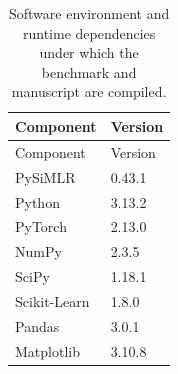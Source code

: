 \documentclass[
  10pt,
  letterpaper,
]{report}
\begin{document}

\begin{longtable}[]{@{}ll@{}}
\caption{Software environment and runtime dependencies under which the
benchmark and manuscript are
compiled.}\label{tbl-software-environment}\tabularnewline
\toprule\noalign{}
Component & Version \\
\midrule\noalign{}
\endfirsthead
\toprule\noalign{}
Component & Version \\
\midrule\noalign{}
\endhead
\bottomrule\noalign{}
\endlastfoot
PySiMLR & 0.43.1 \\
Python & 3.13.2 \\
PyTorch & 2.13.0 \\
NumPy & 2.3.5 \\
SciPy & 1.18.1 \\
Scikit-Learn & 1.8.0 \\
Pandas & 3.0.1 \\
Matplotlib & 3.10.8 \\
\end{longtable}
\end{document}
